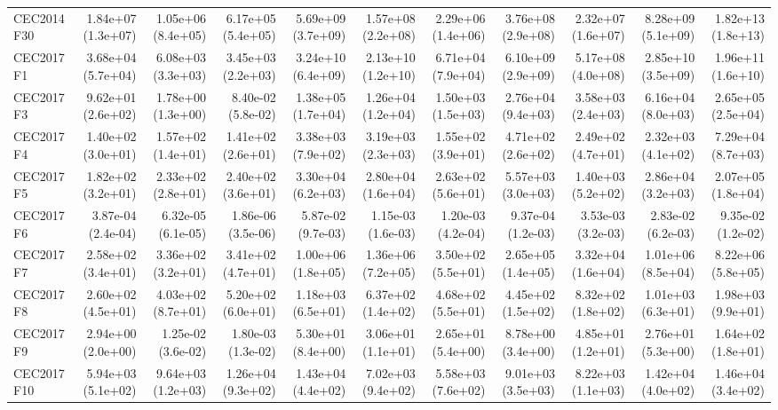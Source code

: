 \begin{longtable}{lrrrrrrrrrr}
CEC2014 F30 & 1.84e+07 (1.3e+07) & 1.05e+06 (8.4e+05) & 6.17e+05 (5.4e+05) & 5.69e+09 (3.7e+09) & 1.57e+08 (2.2e+08) & 2.29e+06 (1.4e+06) & 3.76e+08 (2.9e+08) & 2.32e+07 (1.6e+07) & 8.28e+09 (5.1e+09) & 1.82e+13 (1.8e+13) \\
CEC2017 F1 & 3.68e+04 (5.7e+04) & 6.08e+03 (3.3e+03) & 3.45e+03 (2.2e+03) & 3.24e+10 (6.4e+09) & 2.13e+10 (1.2e+10) & 6.71e+04 (7.9e+04) & 6.10e+09 (2.9e+09) & 5.17e+08 (4.0e+08) & 2.85e+10 (3.5e+09) & 1.96e+11 (1.6e+10) \\
CEC2017 F3 & 9.62e+01 (2.6e+02) & 1.78e+00 (1.3e+00) & 8.40e-02 (5.8e-02) & 1.38e+05 (1.7e+04) & 1.26e+04 (1.2e+04) & 1.50e+03 (1.5e+03) & 2.76e+04 (9.4e+03) & 3.58e+03 (2.4e+03) & 6.16e+04 (8.0e+03) & 2.65e+05 (2.5e+04) \\
CEC2017 F4 & 1.40e+02 (3.0e+01) & 1.57e+02 (1.4e+01) & 1.41e+02 (2.6e+01) & 3.38e+03 (7.9e+02) & 3.19e+03 (2.3e+03) & 1.55e+02 (3.9e+01) & 4.71e+02 (2.6e+02) & 2.49e+02 (4.7e+01) & 2.32e+03 (4.1e+02) & 7.29e+04 (8.7e+03) \\
CEC2017 F5 & 1.82e+02 (3.2e+01) & 2.33e+02 (2.8e+01) & 2.40e+02 (3.6e+01) & 3.30e+04 (6.2e+03) & 2.80e+04 (1.6e+04) & 2.63e+02 (5.6e+01) & 5.57e+03 (3.0e+03) & 1.40e+03 (5.2e+02) & 2.86e+04 (3.2e+03) & 2.07e+05 (1.8e+04) \\
CEC2017 F6 & 3.87e-04 (2.4e-04) & 6.32e-05 (6.1e-05) & 1.86e-06 (3.5e-06) & 5.87e-02 (9.7e-03) & 1.15e-03 (1.6e-03) & 1.20e-03 (4.2e-04) & 9.37e-04 (1.2e-03) & 3.53e-03 (3.2e-03) & 2.83e-02 (6.2e-03) & 9.35e-02 (1.2e-02) \\
CEC2017 F7 & 2.58e+02 (3.4e+01) & 3.36e+02 (3.2e+01) & 3.41e+02 (4.7e+01) & 1.00e+06 (1.8e+05) & 1.36e+06 (7.2e+05) & 3.50e+02 (5.5e+01) & 2.65e+05 (1.4e+05) & 3.32e+04 (1.6e+04) & 1.01e+06 (8.5e+04) & 8.22e+06 (5.8e+05) \\
CEC2017 F8 & 2.60e+02 (4.5e+01) & 4.03e+02 (8.7e+01) & 5.20e+02 (6.0e+01) & 1.18e+03 (6.5e+01) & 6.37e+02 (1.4e+02) & 4.68e+02 (5.5e+01) & 4.45e+02 (1.5e+02) & 8.32e+02 (1.8e+02) & 1.01e+03 (6.3e+01) & 1.98e+03 (9.9e+01) \\
CEC2017 F9 & 2.94e+00 (2.0e+00) & 1.25e-02 (3.6e-02) & 1.80e-03 (1.3e-02) & 5.30e+01 (8.4e+00) & 3.06e+01 (1.1e+01) & 2.65e+01 (5.4e+00) & 8.78e+00 (3.4e+00) & 4.85e+01 (1.2e+01) & 2.76e+01 (5.3e+00) & 1.64e+02 (1.8e+01) \\
CEC2017 F10 & 5.94e+03 (5.1e+02) & 9.64e+03 (1.2e+03) & 1.26e+04 (9.3e+02) & 1.43e+04 (4.4e+02) & 7.02e+03 (9.4e+02) & 5.58e+03 (7.6e+02) & 9.01e+03 (3.5e+03) & 8.22e+03 (1.1e+03) & 1.42e+04 (4.0e+02) & 1.46e+04 (3.4e+02) \\

\end{longtable}
